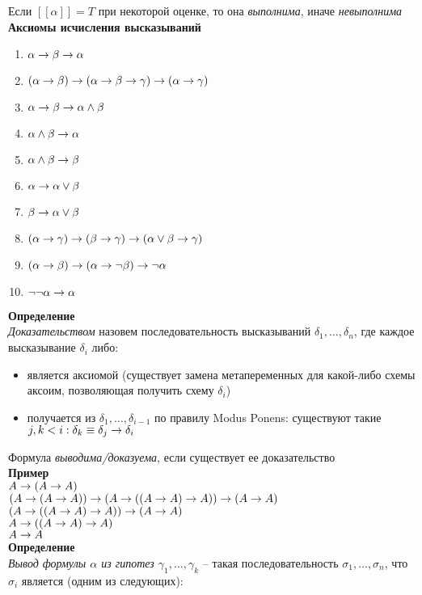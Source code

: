 \documentclass[12pt]{article}
\begin{document}
Если $[[\alpha]] = T$ при некоторой оценке, то она \textit{выполнима}, иначе \textit{невыполнима}\\
\textbf{Аксиомы исчисления высказываний}
\begin{enumerate}
    \item $\alpha \rightarrow \beta \rightarrow \alpha$
    \item $(\alpha \rightarrow \beta) \rightarrow (\alpha \rightarrow \beta \rightarrow \gamma) \rightarrow (\alpha \rightarrow \gamma)$
    \item $\alpha \rightarrow \beta \rightarrow \alpha \land \beta$
    \item $\alpha \land \beta \rightarrow \alpha$
    \item $\alpha \land \beta \rightarrow \beta$
    \item $\alpha \rightarrow \alpha \lor \beta$
    \item $\beta \rightarrow \alpha \lor \beta$
    \item $(\alpha \rightarrow \gamma) \rightarrow (\beta \rightarrow \gamma) \rightarrow (\alpha \lor \beta \rightarrow \gamma)$
    \item $(\alpha \rightarrow \beta) \rightarrow (\alpha \rightarrow \lnot \beta) \rightarrow \lnot \alpha$
    \item $\lnot\lnot \alpha \rightarrow \alpha$
\end{enumerate}
\textbf{Определение}\\
\textit{Доказательством} назовем последовательность высказываний $\delta_1, \ldots, \delta_n$, где каждое высказывание $\delta_i$ либо:
\begin{itemize}
    \item является аксиомой (существует замена метапеременных для какой-либо схемы аксоим, позволяющая получить схему $\delta_i$)
    \item получается из $\delta_1, \ldots, \delta_{i-1}$ по правилу Modus Ponens: существуют такие $j, k < i: \delta_k \equiv \delta_j \rightarrow \delta_i$
\end{itemize}
Формула \textit{выводима/доказуема}, если существует ее доказательство\\
\textbf{Пример}\\
$A \rightarrow (A \rightarrow A)$\\
$(A \rightarrow (A\rightarrow A)) \rightarrow (A \rightarrow ((A\rightarrow A) \rightarrow A)) \rightarrow (A \rightarrow A)$\\
$(A \rightarrow ((A\rightarrow A)\rightarrow A)) \rightarrow (A \rightarrow A)$\\
$A \rightarrow ((A\rightarrow A)\rightarrow A)$\\
$A \rightarrow A$\\
\textbf{Определение}\\
\textit{Вывод формулы $\alpha$ из гипотез $\gamma_1,\ldots, \gamma_k$} -- такая последовательность $\sigma_1, \ldots, \sigma_n$, что $\sigma_i$ является (одним из следующих):
\end{document}
